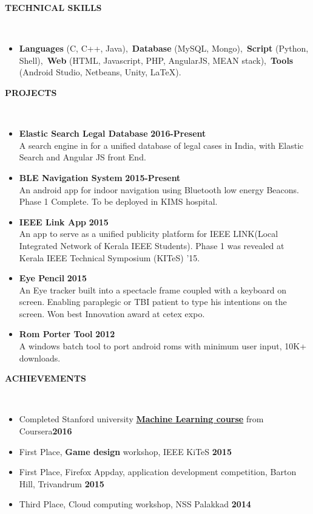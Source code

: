 \documentclass[a4paper,10pt]{article}
\newcommand{\lsep}{-0.5cm}
\newcommand{\resheading}[1]{{\small \colorbox{mygrey}{\begin{minipage}{0.975\textwidth}{\textbf{\uppercase{#1} \vphantom{p\^{E}}}}\end{minipage}}}}
\newcommand{\when}[1]{\hfill \textbf{#1}}
\newenvironment{noSepItemize}
{ \begin{itemize}
    \setlength{\itemsep}{0pt}
    \setlength{\parskip}{0pt}
    \setlength{\parsep}{0pt}     }
{ \end{itemize}                  }
\begin{document}
\resheading{\textbf{TECHNICAL SKILLS} }\\[\lsep]
\begin{itemize}
\item \noindent \textbf{Languages} (C, C++, Java),\, \textbf{Database} (MySQL, Mongo),\, \textbf{Script} (Python, Shell),\, \textbf{Web} (HTML, Javascript, PHP, AngularJS, MEAN stack),\, \textbf{Tools} (Android Studio, Netbeans, Unity, \LaTeX).
\end{itemize}

\resheading{\textbf{PROJECTS} }\\[\lsep]
\begin{noSepItemize}
\item \textbf{Elastic Search Legal Database} \when{2016-Present}\\
	A search engine in for a unified database of legal cases in India, with Elastic Search and Angular JS front End.
\item \textbf{BLE Navigation System} \when{2015-Present}\\
	An android app for indoor navigation using Bluetooth low energy Beacons. Phase 1 Complete. To be deployed in KIMS hospital.
\item \textbf{IEEE Link App} \when{2015}\\
	An app to serve as a unified publicity platform for IEEE LINK(Local Integrated Network of Kerala IEEE Students). Phase 1 was revealed at Kerala IEEE Technical Symposium (KITeS) '15.
\item \textbf{Eye Pencil} \when{2015}\\
	An Eye tracker built into a spectacle frame coupled with a keyboard on screen. Enabling 
paraplegic or TBI patient to type his intentions on the screen. Won best Innovation award at cetex expo.
\item \textbf{Rom Porter Tool} \when{2012}\\
	A windows batch tool to port android roms with minimum user input, 10K+ downloads.
\end{noSepItemize}

\resheading{\textbf{Achievements} }\\[\lsep]
\begin{noSepItemize}
	\item \noindent Completed Stanford university \textbf{\href{https://www.coursera.org/account/accomplishments/records/EJQWCKEBUSBD}{Machine Learning course}} from Coursera\when{2016}
	\item \noindent First Place, \textbf{Game design} workshop, IEEE KiTeS \when{2015}
	\item \noindent First Place, Firefox Appday, application development competition, Barton Hill, Trivandrum \when{2015}
	\item \noindent Third Place, Cloud computing workshop, NSS Palakkad \when{2014}
\end{noSepItemize}
\end{document}
